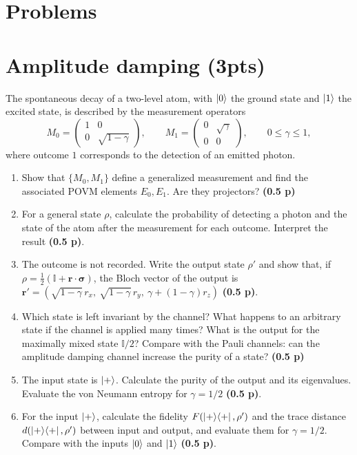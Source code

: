 \documentclass[11pt,a4paper]{article}
\newcommand{\pts}[1]{\textbf{(#1)}}
\newcommand{\id}{\mathbb{I}}
\begin{document}
\section*{Problems}

\section{Amplitude damping (3pts)}

The spontaneous decay of a two-level atom, with $\ket0$ the ground state and $\ket1$ the excited
state, is described by the measurement operators
\[
M_0=\begin{pmatrix}1&0\\0&\sqrt{1-\gamma}\end{pmatrix},\qquad
M_1=\begin{pmatrix}0&\sqrt{\gamma}\\0&0\end{pmatrix},\qquad 0\le\gamma\le1 ,
\]
where outcome $1$ corresponds to the detection of an emitted photon.
\begin{enumerate}
\item Show that $\{M_0,M_1\}$ define a generalized measurement and find the associated POVM
elements $E_0,E_1$. Are they projectors? \pts{0.5 p}
\item For a general state $\rho$, calculate the probability of detecting a photon and the state of
the atom after the measurement for each outcome. Interpret the result \pts{0.5 p}.
\item The outcome is not recorded. Write the output state $\rho'$ and show that, if
$\rho=\frac12(\id+\bm r\cdot\bm\sigma)$, the Bloch vector of the output is
$\bm r'=\left(\sqrt{1-\gamma}\,r_x,\ \sqrt{1-\gamma}\,r_y,\ \gamma+(1-\gamma)r_z\right)$ \pts{0.5 p}.
\item Which state is left invariant by the channel? What happens to an arbitrary state if the
channel is applied many times? What is the output for the maximally mixed state $\id/2$? Compare
with the Pauli channels: can the amplitude damping channel increase the purity of a state? \pts{0.5 p}
\item The input state is $\ket+$. Calculate the purity of the output and its eigenvalues. Evaluate
the von Neumann entropy for $\gamma=1/2$ \pts{0.5 p}.
\item For the input $\ket+$, calculate the fidelity $F(\ket+\!\bra+,\rho')$ and the trace distance
$d(\ket+\!\bra+,\rho')$ between input and output, and evaluate them for $\gamma=1/2$. Compare with
the inputs $\ket0$ and $\ket1$ \pts{0.5 p}.
\end{enumerate}
\end{document}
